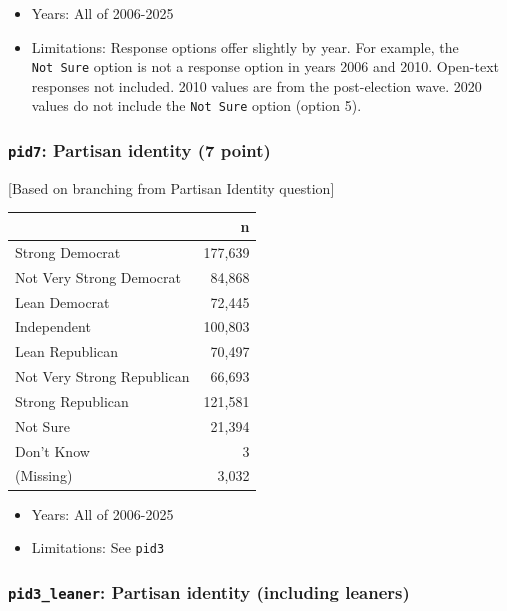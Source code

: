 \documentclass[10pt,article,oneside]{memoir}
\begin{document}
\begin{itemize}
\tightlist
\item
  Years: All of 2006-2025
\item
  Limitations: Response options offer slightly by year. For example, the
  \texttt{Not\ Sure} option is not a response option in years 2006 and
  2010. Open-text responses not included. 2010 values are from the
  post-election wave. 2020 values do not include the \texttt{Not\ Sure}
  option (option 5).
\end{itemize}

\subsubsection{\texorpdfstring{\texttt{pid7}: Partisan identity (7
point)}{pid7: Partisan identity (7 point)}}\label{pid7-partisan-identity-7-point}

{[}Based on branching from Partisan Identity question{]}

\begin{table}[H]
\centering
\begin{tabular}[t]{lr}
\toprule
 & n\\
\midrule
Strong Democrat & 177,639\\
Not Very Strong Democrat & 84,868\\
Lean Democrat & 72,445\\
Independent & 100,803\\
Lean Republican & 70,497\\
Not Very Strong Republican & 66,693\\
Strong Republican & 121,581\\
Not Sure & 21,394\\
Don't Know & 3\\
(Missing) & 3,032\\
\bottomrule
\end{tabular}
\end{table}

\begin{itemize}
\tightlist
\item
  Years: All of 2006-2025
\item
  Limitations: See \texttt{pid3}
\end{itemize}

\subsubsection{\texorpdfstring{\texttt{pid3\_leaner}: Partisan identity
(including
leaners)}{pid3\_leaner: Partisan identity (including leaners)}}\label{pid3_leaner-partisan-identity-including-leaners}
\end{document}
